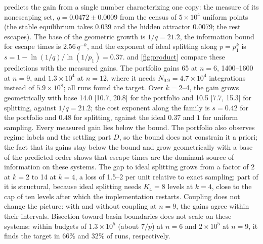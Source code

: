  predicts the gain from a single number characterizing one copy: the measure of its nonescaping set, $q=0.0472\pm0.0009$ from the census of $5\times10^4$ uniform points (the stable equilibrium takes 0.039 and the hidden attractor 0.0079; the rest escapes). The base of the geometric growth is $1/q=21.2$, the information bound for escape times is $2.56\,q^{-k}$, and the exponent of ideal splitting along $p=p_1^k$ is $s=1-\ln(1/q)/\ln(1/p_1)=0.37$.  and \cref{fig:product} compare these predictions with the measured gains. The portfolio gains 65 at $n=6$, 1400--1600 at $n=9$, and $1.3\times10^4$ at $n=12$, where it needs $N_{0.9}=4.7\times10^4$ integrations instead of $5.9\times10^8$; all runs found the target. Over $k=2$--4, the gain grows geometrically with base 14.0 [10.7, 20.8] for the portfolio and 10.5 [7.7, 15.3] for splitting, against $1/q=21.2$; the cost exponent along the family is $s=0.42$ for the portfolio and $0.48$ for splitting, against the ideal $0.37$ and $1$ for uniform sampling. Every measured gain lies below the bound. The portfolio also observes regime labels and the settling part $D$, so the bound does not constrain it a priori; the fact that its gains stay below the bound and grow geometrically with a base of the predicted order shows that escape times are the dominant source of information on these systems. The gap to ideal splitting grows from a factor of 2 at $k=2$ to 14 at $k=4$, a loss of 1.5--2 per unit relative to exact sampling; part of it is structural, because ideal splitting needs $K_4=8$ levels at $k=4$, close to the cap of ten levels after which the implementation restarts. Coupling does not change the picture: with and without coupling at $n=9$, the gains agree within their intervals. Bisection toward basin boundaries does not scale on these systems: within budgets of $1.3\times10^5$ (about $7/p$) at $n=6$ and $2\times10^5$ at $n=9$, it finds the target in 66\% and 32\% of runs, respectively.


